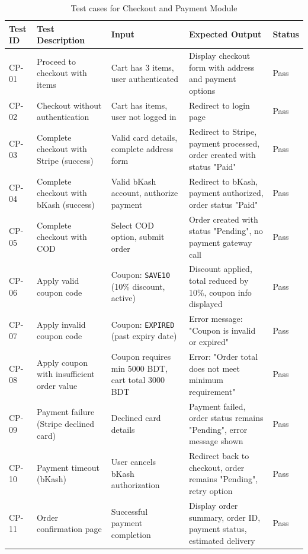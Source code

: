 \begin{table}[H]
\centering
\caption{Test cases for Checkout and Payment Module}
\label{tab:test-checkout}
\small
\begin{tabular}{|p{1.3cm}|p{3.5cm}|p{3cm}|p{3.5cm}|p{1.2cm}|}
\hline
\textbf{Test ID} & \textbf{Test Description} & \textbf{Input} & \textbf{Expected Output} & \textbf{Status} \\
\hline
CP-01 & Proceed to checkout with items & Cart has 3 items, user authenticated & Display checkout form with address and payment options & Pass \\
\hline
CP-02 & Checkout without authentication & Cart has items, user not logged in & Redirect to login page & Pass \\
\hline
CP-03 & Complete checkout with Stripe (success) & Valid card details, complete address form & Redirect to Stripe, payment processed, order created with status "Paid" & Pass \\
\hline
CP-04 & Complete checkout with bKash (success) & Valid bKash account, authorize payment & Redirect to bKash, payment authorized, order status "Paid" & Pass \\
\hline
CP-05 & Complete checkout with COD & Select COD option, submit order & Order created with status "Pending", no payment gateway call & Pass \\
\hline
CP-06 & Apply valid coupon code & Coupon: \texttt{SAVE10} (10\% discount, active) & Discount applied, total reduced by 10\%, coupon info displayed & Pass \\
\hline
CP-07 & Apply invalid coupon code & Coupon: \texttt{EXPIRED} (past expiry date) & Error message: "Coupon is invalid or expired" & Pass \\
\hline
CP-08 & Apply coupon with insufficient order value & Coupon requires min 5000 BDT, cart total 3000 BDT & Error: "Order total does not meet minimum requirement" & Pass \\
\hline
CP-09 & Payment failure (Stripe declined card) & Declined card details & Payment failed, order status remains "Pending", error message shown & Pass \\
\hline
CP-10 & Payment timeout (bKash) & User cancels bKash authorization & Redirect back to checkout, order remains "Pending", retry option & Pass \\
\hline
CP-11 & Order confirmation page & Successful payment completion & Display order summary, order ID, payment status, estimated delivery & Pass \\
\hline
\end{tabular}
\end{table}

